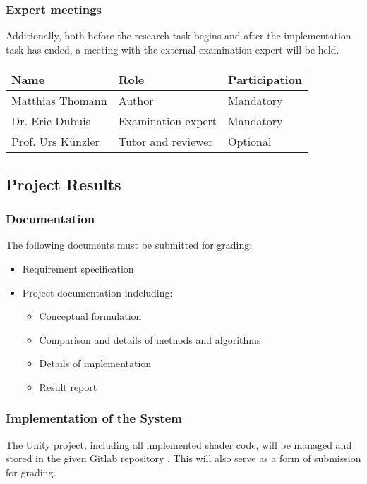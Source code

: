\subsubsection{Expert meetings}
Additionally, both before the research task begins and after the implementation task has ended, a meeting with the external examination expert will be held.
\emptyline
\noindent\begin{tabular}{|l|l|l|}
    \hline
    \textbf{Name}       & \textbf{Role}         & \textbf{Participation}\\ \hline
    Matthias Thomann    & Author                & Mandatory             \\ \hline
    Dr. Eric Dubuis     & Examination expert    & Mandatory             \\ \hline
    Prof. Urs Künzler   & Tutor and reviewer    & Optional              \\ \hline
\end{tabular}
\emptyline


\clearpage

\subsection{Project Results}

\subsubsection{Documentation}
The following documents must be submitted for grading:
\begin{itemize}
    \item Requirement specification
    \item Project documentation indcluding:
    \begin{itemize}
        \item Conceptual formulation
        \item Comparison and details of methods and algorithms
        \item Details of implementation
        \item Result report
    \end{itemize}
\end{itemize}

\subsubsection{Implementation of the System}
The Unity project, including all implemented shader code, will be managed and stored in the given Gitlab repository \cite{gitlab}. This will also serve as a form of submission for grading.

